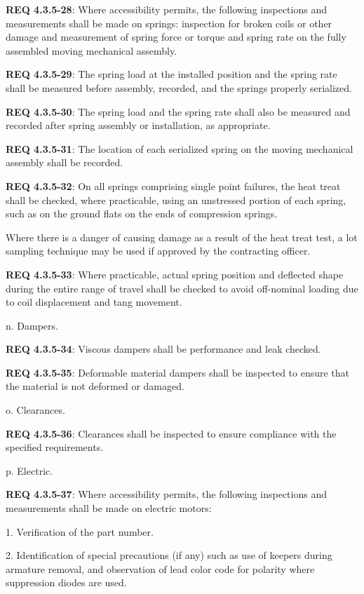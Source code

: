 \documentclass[12pt]{article}
\begin{document}
\noindent \textbf{REQ 4.3.5-28}: Where accessibility permits, the following inspections and measurements shall be made on springs: inspection for broken coils or other damage and measurement of spring force or torque and spring rate on the fully assembled moving mechanical assembly. 

\noindent \textbf{REQ 4.3.5-29}: The spring load at the installed position and the spring rate shall be measured before assembly, recorded, and the springs properly serialized. 

\noindent \textbf{REQ 4.3.5-30}: The spring load and the spring rate shall also be measured and recorded after spring assembly or installation, as appropriate. 

\noindent \textbf{REQ 4.3.5-31}: The location of each serialized spring on the moving mechanical assembly shall be recorded. 

\noindent \textbf{REQ 4.3.5-32}: On all springs comprising single point failures, the heat treat shall be checked, where practicable, using an unstressed portion of each spring, such as on the ground flats on the ends of compression springs. 

Where there is a danger of causing damage as a result of the heat treat test, a lot sampling technique may be used if approved by the contracting officer. 

\noindent \textbf{REQ 4.3.5-33}: Where practicable, actual spring position and deflected shape during the entire range of travel shall be checked to avoid off-nominal loading due to coil displacement and tang movement.

n. Dampers. 

\noindent \textbf{REQ 4.3.5-34}: Viscous dampers shall be performance and leak checked. 

\noindent \textbf{REQ 4.3.5-35}: Deformable material dampers shall be inspected to ensure that the material is not deformed or damaged.

o. Clearances. 

\noindent \textbf{REQ 4.3.5-36}: Clearances shall be inspected to ensure compliance with the specified requirements.

p. Electric.
 
\noindent \textbf{REQ 4.3.5-37}: Where accessibility permits, the following inspections and measurements shall be made on electric motors:

1. Verification of the part number.

2. Identification of special precautions (if any) such as use of keepers during armature removal, and observation of lead color code for polarity where suppression diodes are used.
\end{document}
